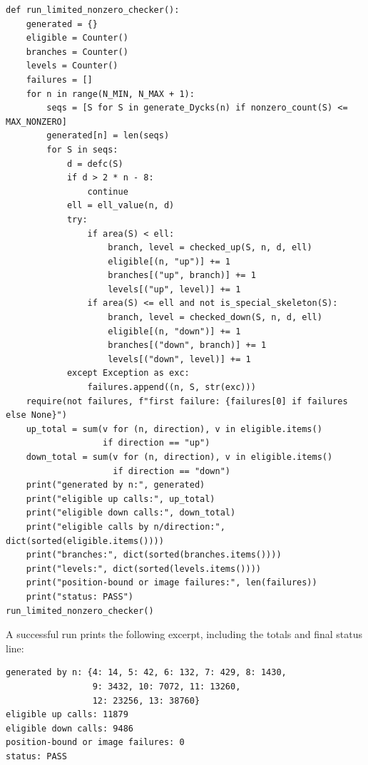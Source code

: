 \documentclass[11pt]{article}
\theoremstyle{plain}
\theoremstyle{definition}
\theoremstyle{remark}
\begin{document}
\begin{lstlisting}
def run_limited_nonzero_checker():
    generated = {}
    eligible = Counter()
    branches = Counter()
    levels = Counter()
    failures = []
    for n in range(N_MIN, N_MAX + 1):
        seqs = [S for S in generate_Dycks(n) if nonzero_count(S) <= MAX_NONZERO]
        generated[n] = len(seqs)
        for S in seqs:
            d = defc(S)
            if d > 2 * n - 8:
                continue
            ell = ell_value(n, d)
            try:
                if area(S) < ell:
                    branch, level = checked_up(S, n, d, ell)
                    eligible[(n, "up")] += 1
                    branches[("up", branch)] += 1
                    levels[("up", level)] += 1
                if area(S) <= ell and not is_special_skeleton(S):
                    branch, level = checked_down(S, n, d, ell)
                    eligible[(n, "down")] += 1
                    branches[("down", branch)] += 1
                    levels[("down", level)] += 1
            except Exception as exc:
                failures.append((n, S, str(exc)))
    require(not failures, f"first failure: {failures[0] if failures else None}")
    up_total = sum(v for (n, direction), v in eligible.items()
                   if direction == "up")
    down_total = sum(v for (n, direction), v in eligible.items()
                     if direction == "down")
    print("generated by n:", generated)
    print("eligible up calls:", up_total)
    print("eligible down calls:", down_total)
    print("eligible calls by n/direction:", dict(sorted(eligible.items())))
    print("branches:", dict(sorted(branches.items())))
    print("levels:", dict(sorted(levels.items())))
    print("position-bound or image failures:", len(failures))
    print("status: PASS")
run_limited_nonzero_checker()
\end{lstlisting}
A successful run prints the following excerpt, including the totals and final
status line:
\begin{lstlisting}
generated by n: {4: 14, 5: 42, 6: 132, 7: 429, 8: 1430,
                 9: 3432, 10: 7072, 11: 13260,
                 12: 23256, 13: 38760}
eligible up calls: 11879
eligible down calls: 9486
position-bound or image failures: 0
status: PASS
\end{lstlisting}
\end{document}

